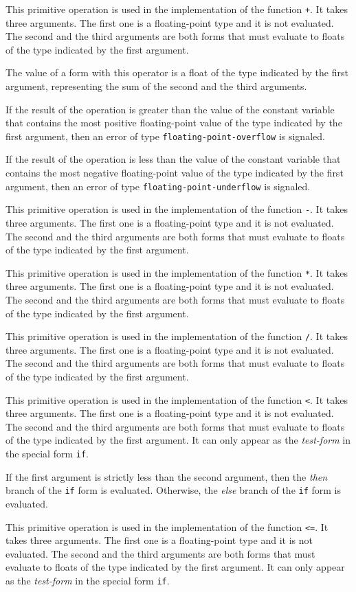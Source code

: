  {}

\def\ittakesthree{It takes three arguments.  The
first one is a floating-point type and it is not evaluated.  The
second and the third arguments are both forms that must evaluate to
floats of the type indicated by the first argument.}

This primitive operation is used in the implementation of the
\commonlisp{} function \texttt{+}.  \ittakesthree{}

The value of a form with this operator is a float of the type
indicated by the first argument, representing the sum of the second
and the third arguments.

If the result of the operation is greater than the value of the
constant variable that contains the most positive floating-point value
of the type indicated by the first argument, then an error of type
\texttt{floating-point-overflow} is signaled.

If the result of the operation is less than the value of the constant
variable that contains the most negative floating-point value of the
type indicated by the first argument, then an error of type
\texttt{floating-point-underflow} is signaled.

 {}

This primitive operation is used in the implementation of the
\commonlisp{} function \texttt{-}.  \ittakesthree{}

 {}

This primitive operation is used in the implementation of the
\commonlisp{} function \texttt{*}.  \ittakesthree{}

 {}

This primitive operation is used in the implementation of the
\commonlisp{} function \texttt{/}.  \ittakesthree{}

 {}

This primitive operation is used in the implementation of the
\commonlisp{} function \texttt{<}.  \ittakesthree{}
It can only appear as the \emph{test-form} in the special form
\texttt{if}.

If the first argument is strictly less than the second argument, then
the \emph{then} branch of the \texttt{if} form is evaluated.
Otherwise, the \emph{else} branch of the \texttt{if} form is
evaluated.

 {}

This primitive operation is used in the implementation of the
\commonlisp{} function \texttt{<=}.  \ittakesthree{}
It can only appear as the \emph{test-form} in the special form
\texttt{if}.

